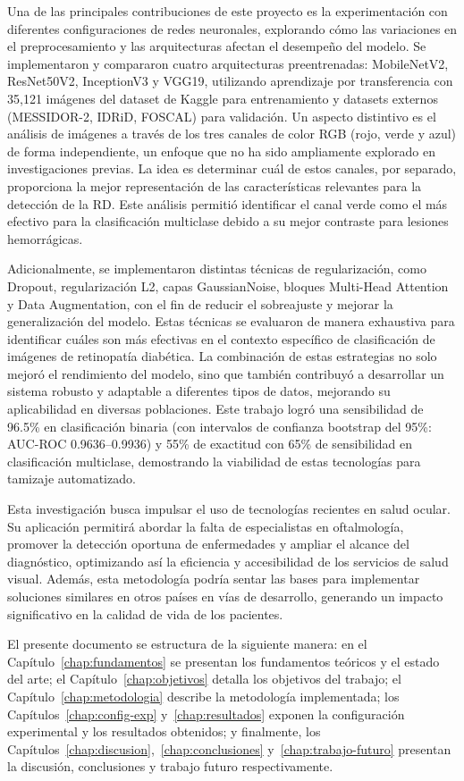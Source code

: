 Una de las principales contribuciones de este proyecto es la experimentación con diferentes configuraciones de redes neuronales, explorando cómo las variaciones en el preprocesamiento y las arquitecturas afectan el desempeño del modelo. Se implementaron y compararon cuatro arquitecturas preentrenadas: MobileNetV2, ResNet50V2, InceptionV3 y VGG19, utilizando aprendizaje por transferencia con 35,121 imágenes del dataset de Kaggle para entrenamiento y datasets externos (MESSIDOR-2, IDRiD, FOSCAL) para validación. Un aspecto distintivo es el análisis de imágenes a través de los tres canales de color RGB (rojo, verde y azul) de forma independiente, un enfoque que no ha sido ampliamente explorado en investigaciones previas. La idea es determinar cuál de estos canales, por separado, proporciona la mejor representación de las características relevantes para la detección de la RD. Este análisis permitió identificar el canal verde como el más efectivo para la clasificación multiclase debido a su mejor contraste para lesiones hemorrágicas.

Adicionalmente, se implementaron distintas técnicas de regularización, como Dropout, regularización L2, capas GaussianNoise, bloques Multi-Head Attention y Data Augmentation, con el fin de reducir el sobreajuste y mejorar la generalización del modelo. Estas técnicas se evaluaron de manera exhaustiva para identificar cuáles son más efectivas en el contexto específico de clasificación de imágenes de retinopatía diabética. La combinación de estas estrategias no solo mejoró el rendimiento del modelo, sino que también contribuyó a desarrollar un sistema robusto y adaptable a diferentes tipos de datos, mejorando su aplicabilidad en diversas poblaciones. Este trabajo logró una sensibilidad de 96.5\% en clasificación binaria (con intervalos de confianza bootstrap del 95\%: AUC-ROC 0.9636–0.9936) y 55\% de exactitud con 65\% de sensibilidad en clasificación multiclase, demostrando la viabilidad de estas tecnologías para tamizaje automatizado.

Esta investigación busca impulsar el uso de tecnologías recientes en salud ocular. Su aplicación permitirá abordar la falta de especialistas en oftalmología, promover la detección oportuna de enfermedades y ampliar el alcance del diagnóstico, optimizando así la eficiencia y accesibilidad de los servicios de salud visual. Además, esta metodología podría sentar las bases para implementar soluciones similares en otros países en vías de desarrollo, generando un impacto significativo en la calidad de vida de los pacientes.

El presente documento se estructura de la siguiente manera: en el Capítulo~\ref{chap:fundamentos} se presentan los fundamentos teóricos y el estado del arte; el Capítulo~\ref{chap:objetivos} detalla los objetivos del trabajo; el Capítulo~\ref{chap:metodologia} describe la metodología implementada; los Capítulos~\ref{chap:config-exp} y~\ref{chap:resultados} exponen la configuración experimental y los resultados obtenidos; y finalmente, los Capítulos~\ref{chap:discusion},~\ref{chap:conclusiones} y~\ref{chap:trabajo-futuro} presentan la discusión, conclusiones y trabajo futuro respectivamente.

